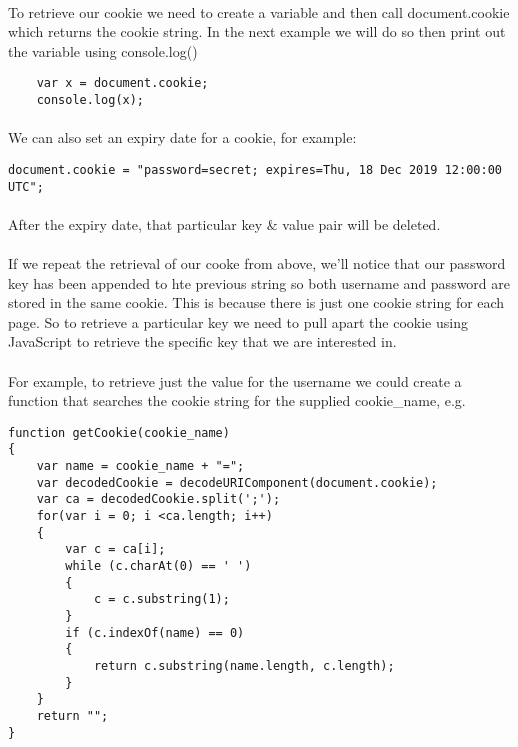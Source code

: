 \documentclass[10pt, a4paper]{article}
\begin{document}
\paragraph{} To retrieve our cookie we need to create a variable and then call document.cookie which returns the cookie string. In the next example we will do so then print out the variable using console.log()
\begin{lstlisting}
    var x = document.cookie;
    console.log(x);
\end{lstlisting}
\paragraph{} We can also set an expiry date for a cookie, for example:

\begin{lstlisting}
document.cookie = "password=secret; expires=Thu, 18 Dec 2019 12:00:00 UTC"; 
\end{lstlisting}

\paragraph{} After the expiry date, that particular key \& value pair will be deleted.

\paragraph{} If we repeat the retrieval of our cooke from above, we'll notice that our password key has been appended to hte previous string so both username and password are stored in the same cookie. This is because there is just one cookie string for each page. So to retrieve a particular key we need to pull apart the cookie using JavaScript to retrieve the specific key that we are interested in.

\paragraph{} For example, to retrieve just the value for the username we could create a function that searches the cookie string for the supplied cookie\_name, e.g.
\begin{lstlisting}
function getCookie(cookie_name)
{
    var name = cookie_name + "=";
    var decodedCookie = decodeURIComponent(document.cookie);
    var ca = decodedCookie.split(';');
    for(var i = 0; i <ca.length; i++)
    {
        var c = ca[i];
        while (c.charAt(0) == ' ') 
        {
            c = c.substring(1);
        }
        if (c.indexOf(name) == 0) 
        {
            return c.substring(name.length, c.length);
        }
    }
    return "";
}
\end{lstlisting}
\end{document}
